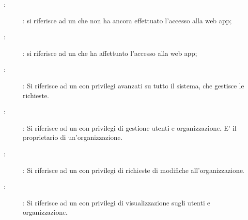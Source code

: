 \documentclass[../analisi-dei-requisiti.tex]{subfiles}
\begin{document}
\begin{description}
  \item[:]: si riferisce ad un  che non ha ancora effettuato l'accesso alla web app;
  \item[:]: si riferisce ad un  che ha affettuato l'accesso alla web app;
  \item[:]: Si riferisce ad un  con privilegi avanzati su tutto il sistema, che gestisce le richieste.
  \item[:]: Si riferisce ad un  con privilegi di gestione utenti e organizzazione. E' il proprietario di un'organizzazione.
  \item[:]: Si riferisce ad un  con privilegi di richieste di modifiche all'organizzazione.
  \item[:]: Si riferisce ad un  con privilegi di visualizzazione sugli utenti e organizzazione.
\end{description}
\end{document}
